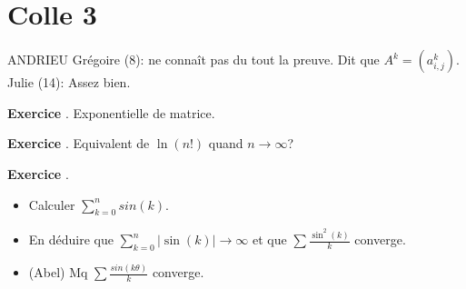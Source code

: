 \documentclass[10pt,a4paper]{article}
\newcounter{question}
\newcounter{exo}
\newenvironment{exo}{\vspace{0.5cm}\setcounter{question}{0}\addtocounter{exo}{1} \noindent \textbf{Exercice \theexo}. \normalsize }{\par}
\begin{document}
	\section*{Colle 3}
	\setcounter{exo}{0}
	ANDRIEU Grégoire (8): ne connaît pas du tout la preuve. Dit que $A^k = (a_{i,j}^k)$.\\
	Julie (14): Assez bien.\\
	
	\begin{exo}
		Exponentielle de matrice.
	\end{exo}
	
	\begin{exo}
		Equivalent de $\ln(n!)$ quand $n \longrightarrow \infty$?
	\end{exo}

	\begin{exo}
		\begin{itemize}
			\item Calculer $\sum_{k=0}^{n} sin(k)$.
			\item En déduire que $\sum_{k=0}^{n} \vert \sin(k) \vert \rightarrow \infty$ et que $\sum \frac{\sin^2(k)}{k}$ converge.
			\item (Abel) Mq $\sum \frac{sin(k \theta)}{k}$ converge.
		\end{itemize}			
	\end{exo}
\end{document}
